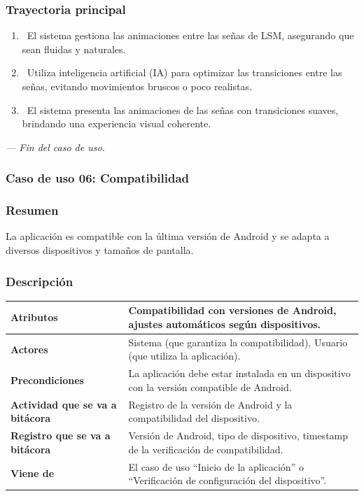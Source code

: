 \subsubsection{Trayectoria principal}
\begin{enumerate}[label=\textbf{\arabic*}, leftmargin=1.5cm]
    \item \UCsystem \ El sistema gestiona las animaciones entre las señas de LSM, asegurando que sean fluidas y naturales.
    
    \item \UCsystem \ Utiliza inteligencia artificial (IA) para optimizar las transiciones entre las señas, evitando movimientos bruscos o poco realistas.
    
    \item \UCsystem \ El sistema presenta las animaciones de las señas con transiciones suaves, brindando una experiencia visual coherente.

\end{enumerate}

\textit{--- Fin del caso de uso.}
\newpage
\subsubsection{Caso de uso 06: Compatibilidad}
\subsubsection{Resumen}
La aplicación es compatible con la última versión de Android y se adapta a diversos dispositivos y tamaños de pantalla.
\subsubsection{Descripción}
\noindent
\begin{tabularx}{\textwidth}{|l|X|}
\hline
\textbf{Atributos} & Compatibilidad con versiones de Android, ajustes automáticos según dispositivos. \\ \hline
\textbf{Actores} & Sistema (que garantiza la compatibilidad), Usuario (que utiliza la aplicación). \\ \hline
\textbf{Precondiciones} & La aplicación debe estar instalada en un dispositivo con la versión compatible de Android. \\ \hline
\textbf{Actividad que se va a bitácora} & Registro de la versión de Android y la compatibilidad del dispositivo. \\ \hline
\textbf{Registro que se va a bitácora} & Versión de Android, tipo de dispositivo, timestamp de la verificación de compatibilidad. \\ \hline
\textbf{Viene de} & El caso de uso “Inicio de la aplicación” o “Verificación de configuración del dispositivo”. \\ \hline
\end{tabularx}
    
